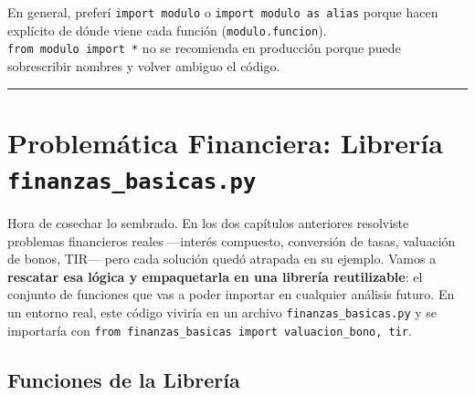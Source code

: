 \documentclass[
  spanish,
  letterpaper,
  DIV=11,
  numbers=noendperiod]{scrreprt}
\begin{document}
\begin{tcolorbox}[enhanced jigsaw, bottomrule=.15mm, colback=white, opacitybacktitle=0.6, arc=.35mm, toprule=.15mm, opacityback=0, breakable, titlerule=0mm, left=2mm, coltitle=black, colbacktitle=quarto-callout-note-color!10!white, colframe=quarto-callout-note-color-frame, leftrule=.75mm, toptitle=1mm, bottomtitle=1mm, title=\textcolor{quarto-callout-note-color}{\faInfo}\hspace{0.5em}{Buena práctica}, rightrule=.15mm]

En general, preferí \texttt{import\ modulo} o
\texttt{import\ modulo\ as\ alias} porque hacen explícito de dónde viene
cada función (\texttt{modulo.funcion}).\\
\texttt{from\ modulo\ import\ *} no se recomienda en producción porque
puede sobrescribir nombres y volver ambiguo el código.

\end{tcolorbox}

\begin{center}\rule{0.5\linewidth}{0.5pt}\end{center}

\section{\texorpdfstring{Problemática Financiera: Librería
\texttt{finanzas\_basicas.py}}{Problemática Financiera: Librería finanzas\_basicas.py}}\label{problemuxe1tica-financiera-libreruxeda-finanzas_basicas.py}

Hora de cosechar lo sembrado. En los dos capítulos anteriores resolviste
problemas financieros reales ---interés compuesto, conversión de tasas,
valuación de bonos, TIR--- pero cada solución quedó atrapada en su
ejemplo. Vamos a \textbf{rescatar esa lógica y empaquetarla en una
librería reutilizable}: el conjunto de funciones que vas a poder
importar en cualquier análisis futuro. En un entorno real, este código
viviría en un archivo \texttt{finanzas\_basicas.py} y se importaría con
\texttt{from\ finanzas\_basicas\ import\ valuacion\_bono,\ tir}.

\subsection{Funciones de la Librería}\label{funciones-de-la-libreruxeda}
\end{document}
